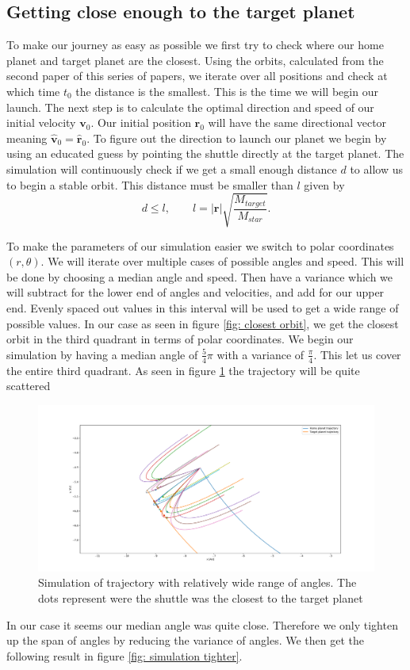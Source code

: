 \documentclass[reprint,english,notitlepage]{revtex4-2}
\begin{document}
\subsection{Getting close enough to the target planet}
To make our journey as easy as possible we first try to check where our home planet and target planet are the closest. Using the orbits, calculated from the second paper %
of this series of papers, we iterate over all positions and check at which time $ t_{0} $ the distance is the smallest. This is the time we will begin our launch. The next step is to calculate the optimal direction and speed of our initial velocity $ \mathbf{v}_0 $. Our initial position $ \mathbf{r}_0 $ will have the same directional vector meaning $ \hat{\mathbf{v}}_0 = \hat{\mathbf{r}}_0  $. To figure out the direction to launch our planet we begin by using an educated guess by pointing the shuttle directly at the target planet. The simulation will continuously check if we get a small enough distance $ d $ to allow us to begin a stable orbit. This distance must be smaller than $ l $ given by
\[
d \le l, \qquad l = \left\vert \mathbf{r} \right\vert \sqrt{\frac{M_{target}}{M_{star}}}.
\]


To make the parameters of our simulation easier we switch to polar coordinates $ (r, θ) $. We will iterate over multiple cases of possible angles and speed. This will be done by choosing a median angle and speed. Then have a variance which we will subtract for the lower end of angles and velocities, and add for our upper end. Evenly spaced out values in this interval will be used to get a wide range of possible values. In our case as seen in figure \ref{fig: closest orbit}, we get the closest orbit in the third quadrant in terms of polar coordinates. We begin our simulation by having a median angle of $ \frac{5}{4}π $ with a variance of $ \frac{π}{4} $. This let us cover the entire third quadrant. As seen in figure \ref{fig: simulation scattered} the trajectory will be quite scattered 

\begin{figure}[h!]
  \centering
  \includegraphics[scale = .125]{Figures/full_angle_scatter.pdf}
  \caption{Simulation of trajectory with relatively wide range of angles. The dots represent were the shuttle was the closest to the target planet }
  \label{fig: simulation scattered}
\end{figure}
In our case it seems our median angle was quite close. Therefore we only tighten up the span of angles by reducing the variance of angles. We then get the following result in figure \ref{fig: simulation tighter}. 
\end{document}
